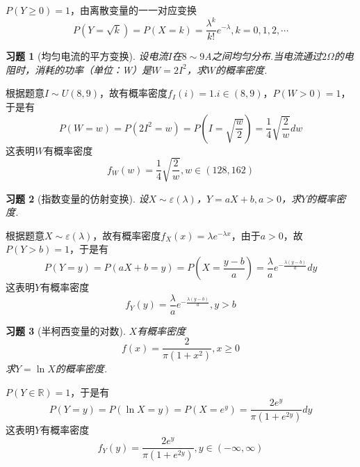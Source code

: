 \documentclass[12pt,fontset=fandol]{ctexart}
\newtheorem{exercise}{习题}[section]
\begin{document}
\begin{solve}\label{a:Y3.16}
$P(Y\geqslant 0)=1$，由离散变量的一一对应变换
\[P(Y = \sqrt k ) = P(X = k) = \frac{{{\lambda ^k}}}{{k!}}{e^{ - \lambda }},k = 0,1,2, \cdots \]
\end{solve}

\begin{exercise}[均匀电流的平方变换]\label{q:Y3.17}
设电流$I$在$8\sim 9$A之间均匀分布.当电流通过$2\Omega$的电阻时，消耗的功率（单位：W）是$W=2I^2$，求$W$的概率密度.\par{}
\end{exercise}

\begin{solve}\label{a:Y3.17}
根据题意$I\sim U(8,9)$，故有概率密度$f_I(i)=1.i\in (8,9)$，$P(W>0)=1$，于是有
\[P(W = w) = P(2{I^2} = w) = P(I = \sqrt {\frac{w}{2}} ) = \frac{1}{4}\sqrt {\frac{2}{w}} dw\]
这表明$W$有概率密度
\[{f_W}(w) = \frac{1}{4}\sqrt {\frac{2}{w}},w\in(128,162) \]
\end{solve}

\begin{exercise}[指数变量的仿射变换]\label{q:Y3.18}
设$X\sim \varepsilon(\lambda)$，$Y=aX+b,a>0$，求$Y$的概率密度.\par{}
\end{exercise}

\begin{solve}\label{a:Y3.18}
根据题意$X\sim \varepsilon(\lambda)$，故有概率密度$f_X(x)=\lambda e^{-\lambda x}$，由于$a>0$，故$P(Y>b)=1$，于是有
\[P(Y = y) = P(aX + b = y) = P(X = \frac{{y - b}}{a}) = \frac{\lambda }{a}{e^{ - \frac{{\lambda (y - b)}}{a}}}dy\]
这表明$Y$有概率密度
\[{f_Y}(y) = \frac{\lambda }{a}{e^{ - \frac{{\lambda (y - b)}}{a}}},y > b\]
\end{solve}

\begin{exercise}[半柯西变量的对数]\label{q:Y3.19}
$X$有概率密度
\[f(x)=\frac{2}{\pi(1+x^2)},x\geqslant 0\]
求$Y=\ln X$的概率密度.\par{}
\end{exercise}

\begin{solve}\label{a:Y3.19}
$P(Y\in \mathbb{R})=1$，于是有 
\[P(Y = y) = P(\ln X = y) = P(X = {e^y}) = \frac{{2{e^y}}}{{\pi (1 + {e^{2y}})}}dy\]
这表明$Y$有概率密度
\[{f_Y}(y) = \frac{{2{e^y}}}{{\pi (1 + {e^{2y}})}},y \in ( - \infty ,\infty )\]
\end{solve}
\end{document}
